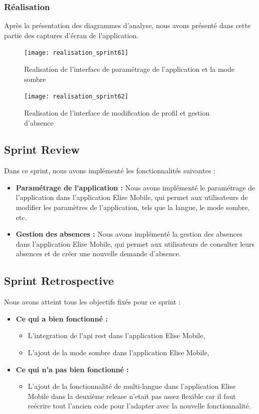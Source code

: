 \subsubsection{Réalisation}

Après la présentation des diagrammes d'analyse, nous avons présenté dans cette partie des captures d'écran de l'application.
\begin{figure}[H]
  \centering
  \texttt{[image: realisation\_sprint61]}
  \caption{Realisation de l'interface de paramétrage de l'application et la mode sombre}
  \label{fig:RealisationInterfaceParametrage}
\end{figure}

\begin{figure}[H]
  \centering
  \texttt{[image: realisation\_sprint62]}
  \caption{Realisation de l'interface de modification de profil et gestion d'absence}
  \label{fig:RealisationInterfaceModificationProfil}
\end{figure}

\subsection{Sprint Review}
Dans ce sprint, nous avons implémenté les fonctionnalités suivantes :
\begin{itemize}
  \item \textbf{Paramétrage de l'application :} Nous avons implémenté le paramétrage de l'application dans l'application Elise Mobile, qui permet aux utilisateurs de modifier les paramètres de l'application, tels que la langue, le mode sombre, etc.\\
  \item \textbf{Gestion des absences :} Nous avons implémenté la gestion des absences dans l'application Elise Mobile, qui permet aux utilisateurs de consulter leurs absences et de créer une nouvelle demande d'absence.\\
\end{itemize}
\subsection{Sprint Retrospective}
Nous avons atteint tous les objectifs fixés pour ce sprint :
\begin{itemize}
  \item \textbf{Ce qui a bien fonctionné :}
  \begin{itemize}
    \item L'integration de l'api rest dans l'application Elise Mobile,
    \item L'ajout de la mode sombre dans l'application Elise Mobile,
  \end{itemize}

    \item \textbf{Ce qui n'a pas bien fonctionné :}
    \begin{itemize}
      \item L'ajout de la fonctionnalité de multi-langue dans l'application Elise Mobile dans la deuxième release n'etait pas assez flexible car il faut reécrire tout l'ancien code pour l'adapter avec la nouvelle fonctionnalité.
    \end{itemize}
      
\end{itemize}
